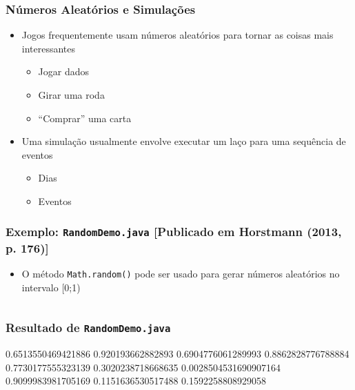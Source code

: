 \documentclass[xcolor={dvipsnames,table},aspectratio=169]{beamer}
\begin{document}
\begin{frame}\frametitle{Números Aleatórios e Simulações}
\begin{itemize}
	\item Jogos frequentemente usam números aleatórios para tornar as coisas mais interessantes
	\begin{itemize}
		\item Jogar dados
		\item Girar uma roda
		\item ``Comprar'' uma carta
	\end{itemize}
	\item Uma simulação usualmente envolve executar um laço para uma sequência de eventos
	\begin{itemize}
		\item Dias
		\item Eventos
	\end{itemize}
\end{itemize}
\end{frame}

\begin{frame}[fragile]\frametitle{Exemplo: \texttt{RandomDemo.java} {\tiny [Publicado em Horstmann (2013, p. 176)]}}
\begin{itemize}
	\item O método \texttt{Math.random()} pode ser usado para gerar números aleatórios no intervalo [0;1)
\end{itemize}
\scriptsize{\inputminted[bgcolor=cyan!10]{java}{src/RandomDemo.java}}
\end{frame}

\begin{frame}[fragile]\frametitle{Resultado de \texttt{RandomDemo.java}}
\begin{javacode}
0.6513550469421886
0.920193662882893
0.6904776061289993
0.8862828776788884
0.7730177555323139
0.3020238718668635
0.0028504531690907164
0.9099983981705169
0.1151636530517488
0.1592258808929058
\end{javacode}
\end{frame}
\end{document}

